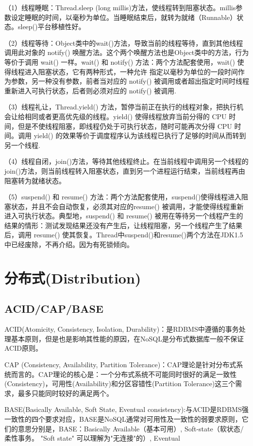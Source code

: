 \documentclass[../../../interview-questions.tex]{subfiles}
\begin{document}
（1）线程睡眠：Thread.sleep (long millis)方法，使线程转到阻塞状态。millis参数设定睡眠的时间，以毫秒为单位。当睡眠结束后，就转为就绪（Runnable）状态。sleep()平台移植性好。

（2）线程等待：Object类中的wait()方法，导致当前的线程等待，直到其他线程调用此对象的 notify() 唤醒方法。这个两个唤醒方法也是Object类中的方法，行为等价于调用 wait() 一样。wait() 和 notify() 方法：两个方法配套使用，wait() 使得线程进入阻塞状态，它有两种形式，一种允许 指定以毫秒为单位的一段时间作为参数，另一种没有参数，前者当对应的 notify() 被调用或者超出指定时间时线程重新进入可执行状态，后者则必须对应的 notify() 被调用.

（3）线程礼让，Thread.yield() 方法，暂停当前正在执行的线程对象，把执行机会让给相同或者更高优先级的线程。yield() 使得线程放弃当前分得的 CPU 时间，但是不使线程阻塞，即线程仍处于可执行状态，随时可能再次分得 CPU 时间。调用 yield() 的效果等价于调度程序认为该线程已执行了足够的时间从而转到另一个线程.

（4）线程自闭，join()方法，等待其他线程终止。在当前线程中调用另一个线程的join()方法，则当前线程转入阻塞状态，直到另一个进程运行结束，当前线程再由阻塞转为就绪状态。

（5）suspend() 和 resume() 方法：两个方法配套使用，suspend()使得线程进入阻塞状态，并且不会自动恢复，必须其对应的resume() 被调用，才能使得线程重新进入可执行状态。典型地，suspend() 和 resume() 被用在等待另一个线程产生的结果的情形：测试发现结果还没有产生后，让线程阻塞，另一个线程产生了结果后，调用 resume() 使其恢复。Thread中suspend()和resume()两个方法在JDK1.5中已经废除，不再介绍。因为有死锁倾向。

\section{分布式(Distribution)}

\subsection{ACID/CAP/BASE}

ACID(Atomicity, Consistency, Isolation, Durability)：是RDBMS中遵循的事务处理基本原则，但是也是影响其性能的原因，在NoSQL是分布式数据库一般不保证ACID原则。

CAP (Consistency, Availability, Partition Tolerance)：CAP理论是针对分布式系统而言的。CAP理论的核心是：一个分布式系统不可能同时很好的满足一致性(Consistency)，可用性(Availability)和分区容错性(Partition Tolerance)这三个需求，最多只能同时较好的满足两个。

BASE(Basically Available, Soft State, Eventual consistency):与ACID是RDBMS强一致性的四个要求对应，BASE是NoSQL通常对可用性及一致性的弱要求原则，它们的意思分别是，BASE：Basically Available（基本可用）, Soft-state（软状态/柔性事务。 "Soft state" 可以理解为"无连接"的）, Eventual
\end{document}
